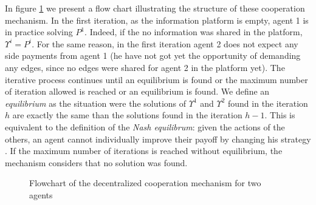 \documentclass{article}
\begin{document}
In figure \ref{fig:iterflowchart} we present a flow chart illustrating the structure of these cooperation mechanism.
In the first iteration, as the information platform is empty, agent 1 is in practice solving $P^1$. Indeed, if the no information was shared in the platform, $\Upsilon^i=P^i$. For the same reason, in the first iteration agent 2 does not expect any side payments from agent 1 (he have not got yet the opportunity of demanding any edges, since no edges were shared for agent 2 in the platform yet). The iterative process continues until an equilibrium is found or the maximum number of iteration allowed is reached or an equilibrium is found. We define an \emph{equilibrium} as the situation were the solutions of $\Upsilon^1$ and $\Upsilon^2$ found in the iteration $h$ are exactly the same than the solutions found in the iteration $h-1$. This is equivalent to the definition of the \emph{Nash equilibrum}: given the actions of the others, an agent cannot individually improve their payoff by changing his strategy \parencite{GONZALEZ2010}. If the maximum number of iterations is reached without equilibrium, the mechanism considers that no solution was found.


\begin{figure}[ht!]
\centering
\caption{Flowchart of the decentralized cooperation mechanism for two agents\label{fig:iterflowchart}}
\end{figure}
\end{document}
